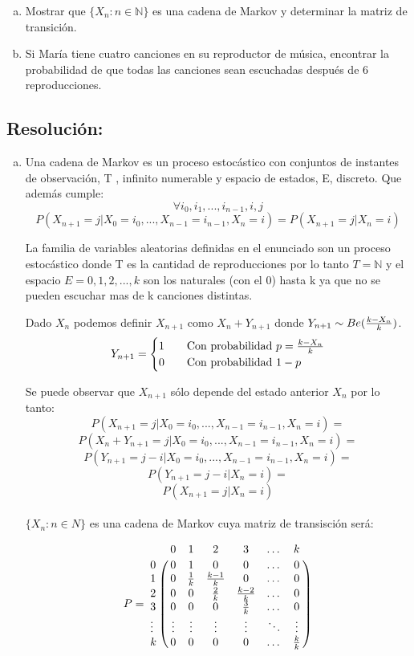 \documentclass{article}
\begin{document}
\begin{enumerate}[(a)] 

\item Mostrar que $\{X_n  : n\in \mathbb{N} \}$ es una cadena de Markov y determinar la matriz de transición.
\item Si María tiene cuatro canciones en su reproductor de música, encontrar la probabilidad de que todas las canciones sean escuchadas después de 6 reproducciones.
\end{enumerate}

\subsection*{Resolución:}


\begin{enumerate}[(a)] 
\item Una cadena de Markov es un proceso estocástico con conjuntos de instantes de observación, T , infinito numerable y espacio de estados, E, discreto.
Que además cumple:
$$\forall i_0,i_1,...,i_{n-1},i,j$$
$$P(X_{n+1} = j|X_0 = i_0,...,X_{n-1}=i_{n-1},X_n = i) = P(X_{n+1} = j|X_n = i)$$
 
La familia de variables aleatorias definidas en el enunciado son un proceso estocástico donde T es la cantidad de reproducciones por lo tanto $T = \mathbb{N}$ y el espacio $E = {0,1,2,...,k}$ son los naturales (con el 0) hasta k ya que no se pueden escuchar mas de k canciones distintas.   

Dado $X_n$ podemos definir $X_{n+1}$ como $X_n + Y_{n+1}$ donde $Y_{n+1} \sim Be({k-X_n\over k})$.
\[   
Y_{n+1} = 
     \begin{cases}
       \text{1} &\quad\text{Con probabilidad } p = {k-X_n\over k}\\
       \text{0} &\quad\text{Con probabilidad } 1 - p\\
     \end{cases}
\]

Se puede observar que $X_{n+1}$ sólo depende del estado anterior $X_n$ por lo tanto:
$$P(X_{n+1} = j|X_0 = i_0,...,X_{n-1}=i_{n-1},X_n = i) =$$
$$P(X_{n} + Y_{n+1} = j|X_0 = i_0,...,X_{n-1}=i_{n-1},X_n = i) = $$
$$P(Y_{n+1} = j - i|X_0 = i_0,...,X_{n-1}=i_{n-1},X_n = i) = $$
$$P(Y_{n+1} = j - i|X_n = i) = $$
$$P(X_{n+1} = j|X_n = i) $$
\\
$\{X_n : n \in N\}$ es una cadena de Markov cuya matriz de transisción será:

$$P = \bordermatrix{\text{ } & 0 & 1 & 2 & 3 & \dots & k\cr
                0& 0 &  1  & 0 & 0 & \dots & 0\cr
                1& 0 &  {1\over k}  & {k-1\over k} & 0 & \dots & 0\cr
                2& 0 &  0  & {2\over k} & {k-2\over k} & \dots & 0\cr
                3 & 0 &  0  & 0 & {3\over k} & \dots  & 0\cr
                \vdots& \vdots & \vdots  & \vdots & \vdots & \ddots & \vdots \cr
                k & 0 & 0 & 0 & 0 & \dots &{k\over k}}$$



\end{enumerate}
\end{document}
